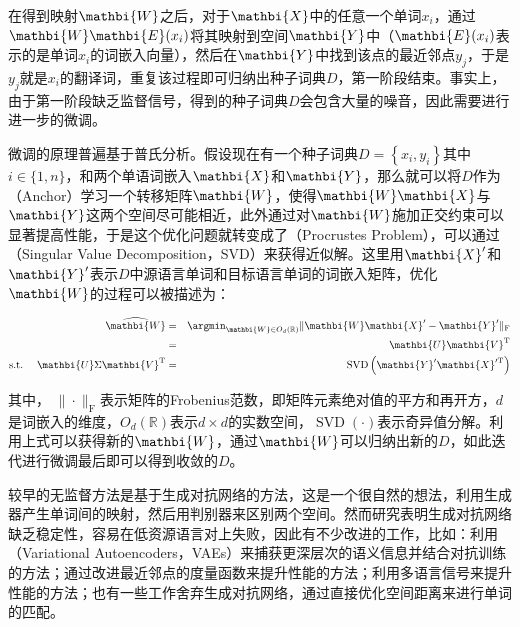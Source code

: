 \parinterval 在得到映射$\mathbi{W}$之后，对于$\mathbi{X}$中的任意一个单词$x_{i}$，通过$\mathbi{W} \mathbi{E}({x}_{i})$将其映射到空间$\mathbi{Y}$中（$\mathbi{E}({x}_{i})$表示的是单词$x_{i}$的词嵌入向量），然后在$\mathbi{Y}$中找到该点的最近邻点$y_{j}$，于是$y_{j}$就是$x_{i}$的翻译词，重复该过程即可归纳出种子词典$D$，第一阶段结束。事实上，由于第一阶段缺乏监督信号，得到的种子词典$D$会包含大量的噪音，因此需要进行进一步的微调。

\parinterval 微调的原理普遍基于普氏分析。假设现在有一个种子词典$D=\left\{x_{i}, y_{i}\right\}$其中${i \in\{1, n\}}$，和两个单语词嵌入$\mathbi{X}$和$\mathbi{Y}$，那么就可以将$D$作为{\small{}}（Anchor）学习一个转移矩阵$\mathbi{W}$，使得$\mathbi{W} \mathbi{X}$与$\mathbi{Y}$这两个空间尽可能相近，此外通过对$\mathbi{W}$施加正交约束可以显著提高性能，于是这个优化问题就转变成了{\small{}}（Procrustes Problem），可以通过{\small{}}（Singular Value Decomposition，SVD）来获得近似解。这里用$\mathbi{X}'$和$\mathbi{Y}'$表示$D$中源语言单词和目标语言单词的词嵌入矩阵，优化$\mathbi{W}$的过程可以被描述为：

\begin{eqnarray}
\widehat{\mathbi{W}} & = & \argmin_{\mathbi{W} \in O_{d}(\mathbb{R})}{\|\mathbi{W} \mathbi{X}'- \mathbi{Y}' \|_{\mathrm{F}}} \nonumber \\
                              & = & \mathbi{U} \mathbi{V}^{\rm{T}} \\ \label{eq:16-8}
\textrm{s.t.\ \ \ \ } \mathbi{U} \Sigma \mathbi{V}^{\rm{T}} &= &\operatorname{SVD}\left(\mathbi{Y}' \mathbi{X}'^{\rm{T}}\right)
\label{eq:16-9}
\end{eqnarray}

\noindent 其中， $\|\cdot\|_{\mathrm{F}}$表示矩阵的Frobenius范数，即矩阵元素绝对值的平方和再开方，$d$是词嵌入的维度，$O_d(\mathbb{R})$表示$d\times d$的实数空间，$\operatorname{SVD}(\cdot)$表示奇异值分解。利用上式可以获得新的$\mathbi{W}$，通过$\mathbi{W}$可以归纳出新的$D$，如此迭代进行微调最后即可以得到收敛的$D$。

\parinterval 较早的无监督方法是基于生成对抗网络的方法，这是一个很自然的想法，利用生成器产生单词间的映射，然后用判别器来区别两个空间。然而研究表明生成对抗网络缺乏稳定性，容易在低资源语言对上失败，因此有不少改进的工作，比如：利用{\small{}}（Variational Autoencoders，VAEs）来捕获更深层次的语义信息并结合对抗训练的方法；通过改进最近邻点的度量函数来提升性能的方法；利用多语言信号来提升性能的方法；也有一些工作舍弃生成对抗网络，通过直接优化空间距离来进行单词的匹配。

